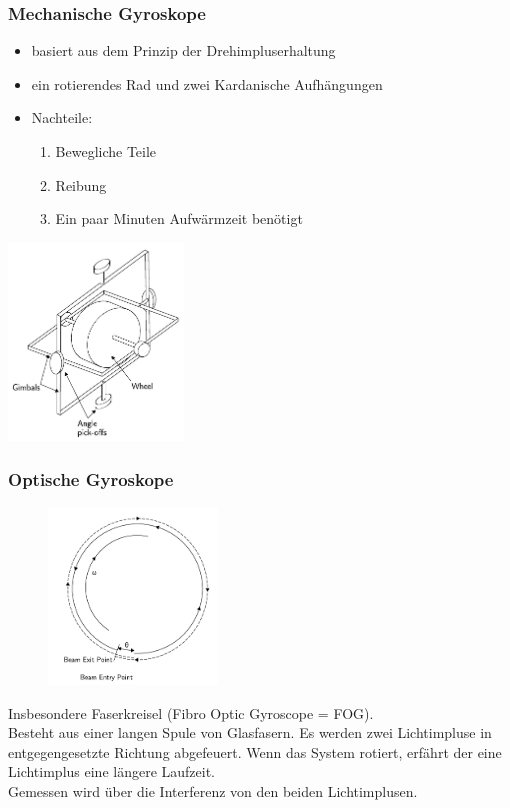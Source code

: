 \documentclass[10pt,a4paper,oneside]{beamer}
\begin{document}
\begin{frame}
	\frametitle{Mechanische Gyroskope}

	\begin{itemize}
		\item basiert aus dem Prinzip der Drehimpluserhaltung
		\item ein rotierendes Rad und zwei Kardanische Aufhängungen
		\item Nachteile:
		\begin{enumerate}
	  		\item Bewegliche Teile
	  		\item Reibung
	  		\item Ein paar Minuten Aufwärmzeit benötigt
	  	\end{enumerate}
	\end{itemize}

	\begin{center}
		\includegraphics[width=0.35\textwidth]{images/mechanical_gyroscope.png} 
	\end{center}
\end{frame}

\begin{frame}
	\frametitle{Optische Gyroskope}
	\begin{figure}
	\includegraphics[width=0.4\textwidth]{images/fog.png} 
	\end{figure}
	
	Insbesondere Faserkreisel (Fibro Optic Gyroscope = FOG). \\
	Besteht aus einer langen Spule von Glasfasern. Es werden zwei Lichtimpluse in entgegengesetzte Richtung abgefeuert. Wenn das System rotiert, erfährt der eine Lichtimplus eine längere Laufzeit.\\
	Gemessen wird über die Interferenz von den beiden Lichtimplusen.\cite{Perlmutter93}

\end{frame}
\end{document}
